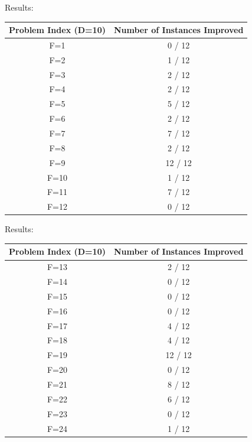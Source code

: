\documentclass{beamer}
\begin{document}
	\begin{frame}
	Results:
	\begin{table}
	\centering
	  \label{tab:experiment2results}
	  \begin{tabular}{cc}
		Problem Index (D=10) & Number of Instances Improved \\
		\hline
		F=1 & 0 / 12 \\
		\hline
		F=2 & 1 / 12 \\
		\hline
		F=3 & 2 / 12 \\
		\hline
		F=4 & 2 / 12 \\
		\hline
		F=5 & 5 / 12 \\
		\hline
		F=6 & 2 / 12 \\
		\hline
		F=7 & 7 / 12 \\
		\hline
		F=8 & 2 / 12 \\
		\hline
		F=9 & 12 / 12 \\
		\hline
		F=10 & 1 / 12 \\
		\hline
		F=11 & 7 / 12 \\
		\hline
		F=12 & 0 / 12 \\                     	
	  \hline
	\end{tabular}
	\end{table}		
	
	\end{frame} 
	
	\begin{frame}
	Results:
	\begin{table}
	\centering
	  \label{tab:experiment2results}
	  \begin{tabular}{cc}
		Problem Index (D=10) & Number of Instances Improved \\
		\hline
		F=13 & 2 / 12 \\
		\hline
		F=14 & 0 / 12 \\
		\hline
		F=15 & 0 / 12 \\
		\hline
		F=16 & 0 / 12 \\
		\hline
		F=17 & 4 / 12 \\
		\hline
		F=18 & 4 / 12 \\
		\hline
		F=19 & 12 / 12 \\
		\hline
		F=20 & 0 / 12 \\
		\hline
		F=21 & 8 / 12 \\
		\hline
		F=22 & 6 / 12 \\
		\hline
		F=23 & 0 / 12 \\
		\hline
		F=24 & 1 / 12 \\                       
		
	  \hline
	\end{tabular}
	\end{table}		
	
	\end{frame}	
	
\end{document}

